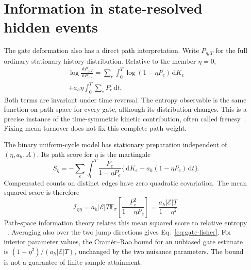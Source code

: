 \documentclass[aps,pre,reprint,amsmath,amssymb,longbibliography,floatfix]{revtex4-2}
\newcommand{\E}{\mathbb E}
\newcommand{\dd}{\,\mathrm d}
\begin{document}
\section{Information in state-resolved hidden events}
\label{app:gate-inference}
The gate deformation also has a direct path interpretation. Write $P_{\eta,T}$ for the full ordinary stationary history distribution. Relative to the member $\eta=0$,
\begin{multline}
 \log\frac{\dd P_{\eta,T}}{\dd P_{0,T}}
 =\sum_e\int_0^T\log(1-\eta P_e)\dd K_e\\
 +a_h\eta\int_0^T\sum_e P_e\dd t.
 \label{eq:gate-path-action}
\end{multline}
Both terms are invariant under time reversal. The entropy observable is the same function on path space for every gate, although its distribution changes. This is a precise instance of the time-symmetric kinetic contribution, often called frenesy~\cite{Maes2016Nondissipative}. Fixing mean turnover does not fix this complete path weight.

The binary uniform-cycle model has stationary preparation independent
of $(\eta,a_h,A)$. Its path score for $\eta$ is the martingale
\begin{equation}
 S_\eta=-\sum_e\int_0^T\frac{P_e}{1-\eta P_e}
 \{\dd K_e-a_h(1-\eta P_e)\dd t\}.
 \label{eq:gate-score}
\end{equation}
Compensated counts on distinct edges have zero quadratic covariation.
The mean squared score is therefore
\begin{equation}
 \mathcal I_{\eta\eta}
 =a_h|\mathcal E|T\E_\pi\left[\frac{P_e^2}{1-\eta P_e}\right]
 =\frac{a_h|\mathcal E|T}{1-\eta^2}.
 \label{eq:gate-score-information}
\end{equation}
Path-space information theory relates this mean squared score to
relative entropy ~\cite{Pantazis2013}. Averaging also over the two jump
directions gives Eq.~\eqref{eq:gate-fisher}. For interior parameter
values, the Cram\'er--Rao bound for an unbiased gate estimate is
$(1-\eta^2)/(a_h|\mathcal E|T)$, unchanged by the two nuisance parameters.
The bound is not a guarantee of finite-sample attainment.
\end{document}
